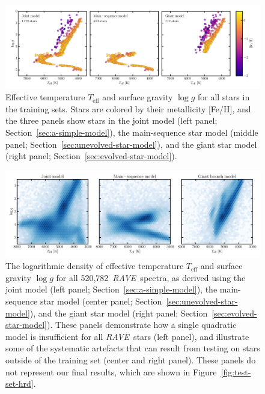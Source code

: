 \documentclass[preprint,trackchanges]{aastex}
\newcommand{\acronym}[1]{{\small{#1}}}
\newcommand{\project}[1]{\textsl{#1}}
\newcommand{\rave}{\project{\acronym{RAVE}}}
\newcommand{\teff}{T_{\mathrm{eff}}}
\newcommand{\logg}{\log g}
\newcommand{\Nspectra}{520,782}
\begin{document}
\begin{figure}[p]
\includegraphics[width=\textwidth]{figures/hrd-train-set.pdf}
\caption{Effective temperature $\teff$ and surface gravity $\logg$ for all stars in the training sets. Stars are colored by their metallicity [Fe/H], and the three panels show stars in the joint model (left panel; Section~\ref{sec:a-simple-model}), the main-sequence star model (middle panel; Section~\ref{sec:unevolved-star-model}), and the giant star model (right panel; Section~\ref{sec:evolved-star-model}).\label{fig:training-set-hrd}}
\end{figure}



\begin{figure}[p]
\includegraphics[width=\textwidth]{figures/test-set-density.pdf}
\caption{The logarithmic density of effective temperature $\teff$ and surface gravity $\logg$ for all \Nspectra\ \rave\ spectra, as derived using the joint model (left panel; Section~\ref{sec:a-simple-model}), the main-sequence star model (center panel; Section~\ref{sec:unevolved-star-model}), and the giant star model (right panel; Section~\ref{sec:evolved-star-model}). These panels demonstrate how a single quadratic model is insufficient for all \rave\ stars (left panel), and illustrate some of the systematic artefacts that can result from testing on stars outside of the training set (center and right panel).  These panels do not represent our final results, which are shown in Figure~\ref{fig:test-set-hrd}.\label{fig:test-set-density}}
\end{figure}
\end{document}
